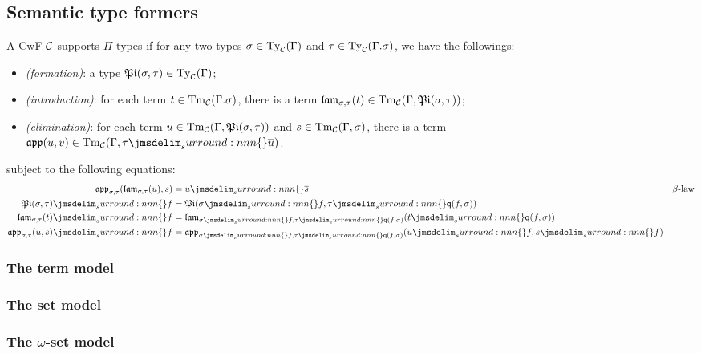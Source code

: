 \documentclass[a4paper]{article}
\begin{document}
\subsection{Semantic type formers}\label{sec:stf}

\begin{definition}
  A CwF $\mathcal{C}$ supports $\Pi$-types if for any two types $\sigma \in \operatorname{Ty}_{\mathcal{C}}(\Gamma)$ and $\tau \in \operatorname{Ty}_{\mathcal{C}}(\Gamma.\sigma)$, we have the followings:
  \begin{itemize}
  \item \emph{(formation)}: a type $\operatorname{\mathfrak{Pi}}(\sigma,\tau) \in \operatorname{Ty}_{\mathcal{C}}(\Gamma)$;
  \item \emph{(introduction)}: for each term $t \in \operatorname{Tm}_{\mathcal{C}}(\Gamma.\sigma)$, there is a term $\operatorname{\mathfrak{lam}}_{\sigma,\tau}(t) \in \operatorname{Tm}_{\mathcal{C}}(\Gamma,\operatorname{\mathfrak{Pi}}(\sigma,\tau))$;
  \item \emph{(elimination)}: for each term $u \in \operatorname{Tm}_{\mathcal{C}}(\Gamma,\operatorname{\mathfrak{Pi}}(\sigma,\tau))$ and $s \in \operatorname{Tm}_{\mathcal{C}}(\Gamma,\sigma)$, there is a term $\app(u,v) \in \Tm{\cC}(\Gamma,\semSubst{\tau}{\ctxSec{u}})$.
  \end{itemize}
  subject to the following equations:
  \begin{align*}
    \app_{\sigma,\tau}(\lam_{\sigma,\tau}(u),s) &= \semSubst{u}{\ctxSec{s}}
    && \beta\text{-law}\\
    \semSubst{\typePi(\sigma,\tau)}{f} &= \typePi(\semSubst{\sigma}{f},\semSubst{\tau}{\ctxWkn(f,\sigma)})\\
    \semSubst{\lam_{\sigma,\tau}(t)}{f} &= \lam_{\semSubst{\sigma}{f},\semSubst{\tau}{\ctxWkn(f,\sigma)}}(\semSubst{t}{\ctxWkn(f,\sigma)})\\
    \semSubst{\app_{\sigma,\tau}(u,s)}{f} &= \app_{\semSubst{\sigma}{f},\semSubst{\tau}{\ctxWkn(f,\sigma)}}(\semSubst{u}{f},\semSubst{s}{f})
  \end{align*}
\end{definition}


\subsubsection{The term model}\label{sec:ttm}
\subsubsection{The set model}\label{sec:tsm}
\subsubsection{The $\omega$-set model}\label{sec:twsm}
\end{document}
